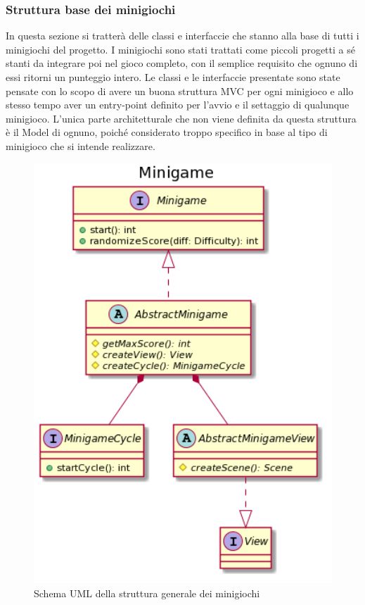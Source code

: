\documentclass[a4paper,12pt]{report}
\begin{document}
	\subsubsection{Struttura base dei minigiochi}
	In questa sezione si tratterà delle classi e interfaccie che stanno alla base di tutti i minigiochi del progetto.\newline
	\newline
	I minigiochi sono stati trattati come piccoli progetti a sé stanti da integrare poi nel gioco completo, con il semplice requisito che ognuno di essi ritorni un punteggio intero.\newline
	Le classi e le interfaccie presentate sono state pensate con lo scopo di avere un buona struttura MVC per ogni minigioco e allo stesso tempo aver un entry-point definito per l'avvio e il settaggio di qualunque minigioco. L'unica parte architetturale che non viene definita da questa struttura è il Model di ognuno, poiché considerato troppo specifico in base al tipo di minigioco che si intende realizzare.\newline
    \begin{figure}[!t]
        \centering{}
        \includegraphics[width=150mm]{images/picchiotti/minigame.png}
        \caption{Schema UML della struttura generale dei minigiochi}
        \label{img:minigame}
    \end{figure}
\end{document}
